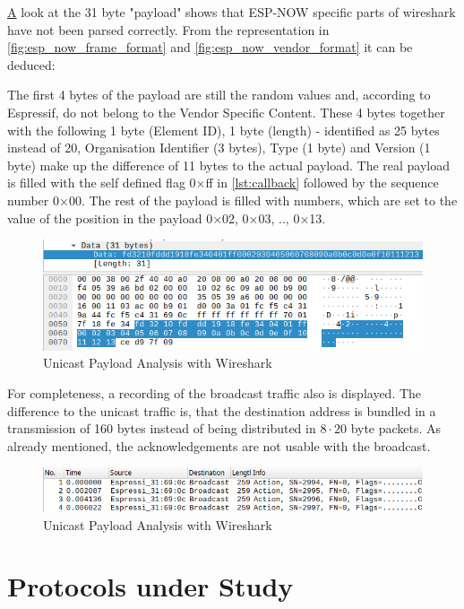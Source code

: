 \href{lst:callback}
A look at the 31 byte "payload" shows that ESP-NOW specific parts of wireshark have not been parsed correctly.
From the representation in \cref{fig:esp_now_frame_format} and \cref{fig:esp_now_vendor_format} 
it can be deduced:

The first 4 bytes of the payload are still the random values and, according to Espressif, 
do not belong to the Vendor Specific Content.
These 4 bytes together with the following 1 byte (Element ID), 1 byte (length) - identified as 25 bytes instead of 20,
Organisation Identifier (3 bytes), Type (1 byte) and Version (1 byte) make up the difference of 11 bytes to the actual payload.
The real payload is filled with the self defined flag 0×ff in \cref{lst:callback} followed by the sequence number 0×00.
The rest of the payload is filled with numbers, which are set to the value of the position in the payload 0×02, 0×03, .., 0×13.

\begin{figure}[h]
	\centering
	\includegraphics[scale=0.4]{figures/wiresharkPayload.png}
	\caption{Unicast Payload Analysis with Wireshark}
	\label{fig:wiresharkPayload}
\end{figure}

For completeness, a recording of the broadcast traffic also is displayed.
The difference to the unicast traffic is,
that the destination address is bundled in a transmission of 160 bytes
instead of being distributed in $8 \cdot 20$ byte packets.
As already mentioned, the acknowledgements are not usable with the broadcast.

\begin{figure}[h]
	\centering
	\includegraphics[scale=0.5]{figures/wiresharkBC.png}
	\caption{Unicast Payload Analysis with Wireshark}
	\label{fig:wiresharkBCTransmission}
\end{figure}

\section{Protocols under Study}

